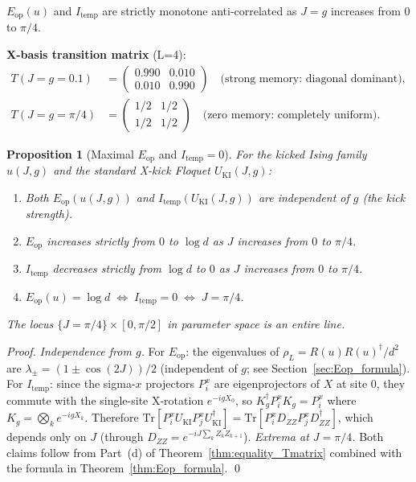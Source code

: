 \documentclass[12pt,a4paper]{article}
\newtheorem{proposition}[theorem]{Proposition}
\begin{document}
\vspace{4pt}
\noindent
$E_\mathrm{op}(u)$ and $I_\mathrm{temp}$ are strictly monotone anti-correlated
as $J=g$ increases from $0$ to $\pi/4$.

\vspace{4pt}
\noindent
\textbf{X-basis transition matrix} (L=4):
\begin{align}
T(J{=}g{=}0.1) &= \begin{pmatrix}0.990 & 0.010 \\ 0.010 & 0.990\end{pmatrix}
  \quad\text{(strong memory: diagonal dominant)},\\
T(J{=}g{=}\pi/4) &= \begin{pmatrix}1/2 & 1/2 \\ 1/2 & 1/2\end{pmatrix}
  \quad\text{(zero memory: completely uniform)}.
\end{align}

\begin{proposition}[Maximal $E_\mathrm{op}$ and $I_\mathrm{temp}=0$]\label{prop:Eop_Itemp}
For the kicked Ising family $u(J,g)$ and the standard X-kick Floquet $U_\mathrm{KI}(J,g)$:
\begin{enumerate}
\item[(a)] Both $E_\mathrm{op}(u(J,g))$ and $I_\mathrm{temp}(U_\mathrm{KI}(J,g))$
  are \emph{independent of $g$} (the kick strength).
\item[(b)] $E_\mathrm{op}$ increases strictly from $0$ to $\log d$ as $J$ increases from $0$ to $\pi/4$.
\item[(c)] $I_\mathrm{temp}$ decreases strictly from $\log d$ to $0$ as $J$ increases from $0$ to $\pi/4$.
\item[(d)] $E_\mathrm{op}(u)=\log d \;\Leftrightarrow\; I_\mathrm{temp}=0 \;\Leftrightarrow\; J=\pi/4$.
\end{enumerate}
The locus $\{J=\pi/4\}\times[0,\pi/2]$ in parameter space is an \emph{entire line}.
\end{proposition}
\begin{proof}
\textit{Independence from $g$.}
For $E_\mathrm{op}$: the eigenvalues of $\rho_L = R(u)R(u)^\dagger/d^2$ are
$\lambda_\pm = (1\pm\cos(2J))/2$ (independent of $g$; see Section~\ref{sec:Eop_formula}).
For $I_\mathrm{temp}$: since the sigma-$x$ projectors $P_i^x$ are eigenprojectors of $X$
at site 0, they commute with the single-site X-rotation $e^{-igX_0}$, so
$K_g^\dagger P_i^x K_g = P_i^x$ where $K_g = \bigotimes_k e^{-igX_k}$.
Therefore $\mathrm{Tr}[P_i^x U_\mathrm{KI} P_j^x U_\mathrm{KI}^\dagger] = \mathrm{Tr}[P_i^x D_{ZZ} P_j^x D_{ZZ}^\dagger]$,
which depends only on $J$ (through $D_{ZZ}=e^{-iJ\sum_kZ_kZ_{k+1}}$).
\textit{Extrema at $J=\pi/4$.} Both claims follow from Part~(d)
of Theorem~\ref{thm:equality_Tmatrix} combined with the formula in Theorem~\ref{thm:Eop_formula}. \qed
\end{proof}
\end{document}

